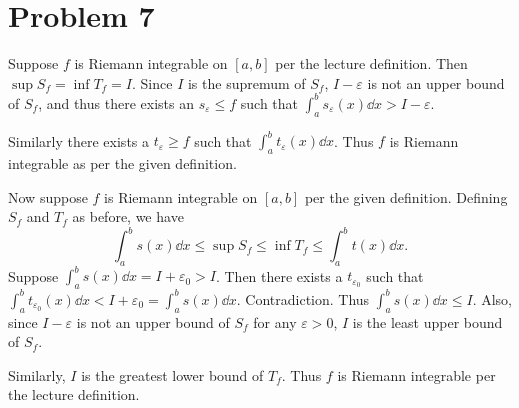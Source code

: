 \documentclass[12pt]{article}
\begin{document}
\section*{Problem 7}
Suppose $f$ is Riemann integrable on $[a, b]$ per the lecture definition. Then $\sup S_{f} = \inf T_{f} = I$.
Since $I$ is the supremum of $S_{f}$, $I - \varepsilon$ is not an upper bound of $S_{f}$, and thus there exists an $s_{\varepsilon} \leq f$ such that $\int_{a}^{b} s_{\varepsilon}(x) \dd x > I - \varepsilon$.

Similarly there exists a $t_{\varepsilon} \geq f$ such that $\int_{a}^{b} t_{\varepsilon}(x) \dd x$. Thus $f$ is Riemann integrable as per the given definition.

Now suppose $f$ is Riemann integrable on $[a, b]$ per the given definition. Defining $S_{f}$ and $T_{f}$ as before, we have \[
    \int_{a}^{b} s(x) \dd x \leq \sup S_{f} \leq \inf T_{f} \leq \int_{a}^{b} t(x) \dd x.
\] Suppose $\int_{a}^{b} s(x) \dd x = I + \varepsilon_{0} > I$.
Then there exists a $t_{\varepsilon_{0}}$ such that $\int_{a}^{b} t_{\varepsilon_{0}}(x) \dd x < I + \varepsilon_{0} = \int_{a}^{b} s(x) \dd x$. Contradiction.
Thus $\int_{a}^{b} s(x) \dd x \leq I$.
Also, since $I - \varepsilon$ is not an upper bound of $S_{f}$ for any $\varepsilon > 0$, $I$ is the least upper bound of $S_{f}$.

Similarly, $I$ is the greatest lower bound of $T_{f}$.
Thus $f$ is Riemann integrable per the lecture definition.
\end{document}
